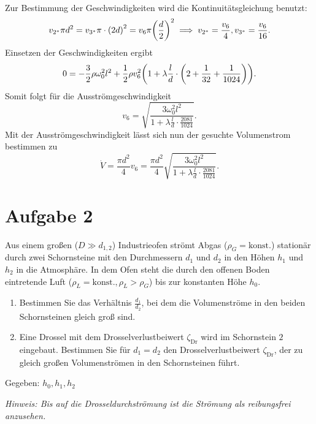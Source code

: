 \documentclass{exercise}
\begin{document}
\begin{enumerate}
\begin{align*}
        \end{align*}
        Zur Bestimmung der Geschwindigkeiten wird die Kontinuitätsgleichung benutzt:
        \[
            v_{2^*}\pi d^2 = v_{3^*}\pi \cdot \parentheses*{2d}^2 = v_6 \pi\parentheses*{\frac{d}{2}}^2 \implies v_{2^*} = \frac{v_6}{4}, v_{3^*} = \frac{v_6}{16}.
        \]
        Einsetzen der Geschwindigkeiten ergibt
        \[
            0 = -\frac{3}{2}\rho\omega_0^2 l^2 + \frac{1}{2}\rho v_6^2 \parentheses*{1 + \lambda\frac{l}{d} \cdot \parentheses*{2 + \frac{1}{32} + \frac{1}{1024}}}.
        \]
        Somit folgt für die Ausströmgeschwindigkeit
        \[
            v_6 = \sqrt{\frac{3\omega_0^2 l^2}{1 + \lambda\frac{l}{d} \cdot \frac{2081}{1024}}}.
        \]
        Mit der Ausströmgeschwindigkeit lässt sich nun der gesuchte Volumenstrom bestimmen zu
        \[
            \dot{V} = \frac{\pi d^2}{4}v_6 = \frac{\pi d^2}{4}\sqrt{\frac{3\omega_0^2 l^2}{1 + \lambda\frac{l}{d} \cdot \frac{2081}{1024}}}.
        \]
    \end{enumerate}
    
    
    \section*{Aufgabe 2}
    
    \begin{problem}
        Aus einem großen (\(D \gg d_{1, 2}\)) Industrieofen strömt Abgas (\(\rho_G = \text{konst.}\)) stationär durch zwei Schornsteine mit den Durchmessern \(d_1\) und \(d_2\) in den Höhen \(h_1\) und \(h_2\) in die Atmosphäre.
        In dem Ofen steht die durch den offenen Boden eintretende Luft (\(\rho_L = \text{konst.}, \rho_L > \rho_G\)) bis zur konstanten Höhe \(h_0\).
        \begin{enumerate}
            \item Bestimmen Sie das Verhältnis \(\frac{d_1}{d_2}\), bei dem die Volumenströme in den beiden Schornsteinen gleich groß sind.
            \item Eine Drossel mit dem Drosselverlustbeiwert \(\zeta_{\text{Dr}}\) wird im Schornstein \(2\) eingebaut.
            Bestimmen Sie für \(d_1 = d_2\) den Drosselverlustbeiwert \(\zeta_{\text{Dr}}\), der zu gleich großen Volumenströmen in den Schornsteinen führt.
        \end{enumerate}
        Gegeben: \(h_0, h_1, h_2\)
        
        \emph{Hinweis: Bis auf die Drosseldurchströmung ist die Strömung als reibungsfrei anzusehen.}
    \end{problem}
    
\end{document}
